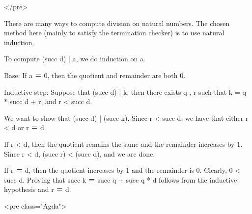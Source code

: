 </pre>

There are many ways to compute division on natural numbers. The chosen
method here (mainly to satisfy the termination checker) is to use
natural induction.

To compute (succ d) | a, we do induction on a.

Base: If a ＝ 0, then the quotient and remainder are both 0.

Inductive step: Suppose that (succ d) | k, then there exists q , r
such that k = q * succ d + r, and r < succ d.

We want to show that (succ d) | (succ k).
Since r < succ d, we have that either r < d or r ＝ d.

If r < d, then the quotient remains the same and the remainder
increases by 1. Since r < d, (succ r) < (succ d), and we are done.

If r ＝ d, then the quotient increases by 1 and the remainder is 0.
Clearly, 0 < succ d.  Proving that succ k ＝ succ q + succ q * d
follows from the inductive hypothesis and r ＝ d.

<pre class="Agda">


